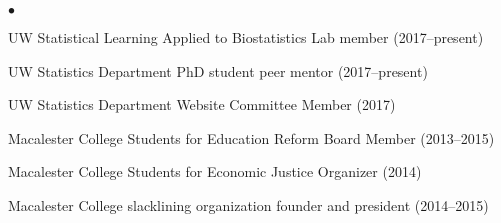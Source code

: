 \documentclass[margin,centered]{res}
\newenvironment{list1}{
  \begin{list}{\ding{113}}{%
      \setlength{\itemsep}{0in}
      \setlength{\parsep}{0in} \setlength{\parskip}{0in}
      \setlength{\topsep}{0in} \setlength{\partopsep}{0in}
      \setlength{\leftmargin}{0.17in}}}{\end{list}}
\newenvironment{list2}{
  \begin{list}{$\bullet$}{%
      \setlength{\itemsep}{0in}
      \setlength{\parsep}{0in} \setlength{\parskip}{0in}
      \setlength{\topsep}{0in} \setlength{\partopsep}{0in}
      \setlength{\leftmargin}{0.2in}}}{\end{list}}
\begin{document}
\begin{resume}
\begin{list1}
\item[]
\begin{list2}
\vspace*{.05in}
\item UW Statistical Learning Applied to Biostatistics Lab member (2017--present)
\item UW Statistics Department PhD student peer mentor (2017--present)
\item UW Statistics Department Website Committee Member (2017)
\item Macalester College Students for Education Reform Board Member (2013--2015)
\item Macalester College Students for Economic Justice Organizer (2014)
\item Macalester College slacklining organization founder and president (2014--2015)
\end{list2}
\end{list1}

\end{resume}
\end{document}
